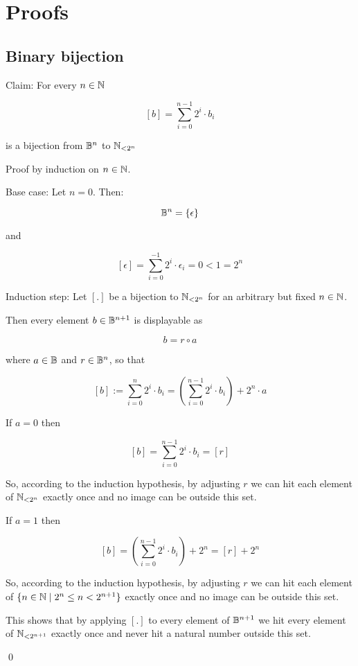 \chapter{Proofs}

\section{Binary bijection}\label{proof:binary_bijection}

Claim: For every $n \in \mathbb{N}$

\[[b] = \sum\limits_{i = 0}^{n-1} 2^i \cdot b_i \]

is a bijection from $\mathbb{B}^n$ to $\mathbb{N}_{<2^ n}$

Proof by induction on $n \in \mathbb{N}$.

Base case: Let $n = 0$. Then:

\[ \mathbb{B}^n = 	\{ \epsilon \}\]

and	

\[  [\epsilon] = \sum\limits_{i = 0}^{-1} 2^i \cdot \epsilon_i = 0 < 1 = 2^n\]

Induction step: Let $[.]$ be a bijection to $\mathbb{N}_{<2^ n}$ for an arbitrary but fixed $n \in \mathbb{N}$.

Then every element $b \in \mathbb{B}^{n+1}$ is displayable as

\[b = r \circ a \]

where $a \in \mathbb{B}$ and $r \in \mathbb{B}^n$, so that

\[[b] := \sum\limits_{i = 0}^{n} 2^i \cdot b_i  = \left(\sum\limits_{i = 0}^{n-1} 2^i \cdot b_i\right) + 2^n \cdot a\]

If $a = 0$ then

\[[b] = \sum\limits_{i = 0}^{n-1} 2^i \cdot b_i = [r]\]

So, according to the induction hypothesis, by adjusting $r$ we can hit each element of $\mathbb{N}_{<2^n}$ exactly once and no image can be outside this set.

If $a = 1$ then

\[[b] = \left(\sum\limits_{i = 0}^{n-1} 2^i \cdot b_i\right) + 2^n = [r] + 2^n\]

So, according to the induction hypothesis, by adjusting $r$ we can hit each element of $\{n \in \mathbb{N} \mid 2^n \leq n < 2^{n+1}\}$ exactly once and no image can be outside this set.

This shows that by applying $[.]$ to every element of $\mathbb{B}^{n+1}$ we hit every element of $\mathbb{N}_{<2^{n+1}}$ exactly once and never hit a natural number outside this set.  

\qed

